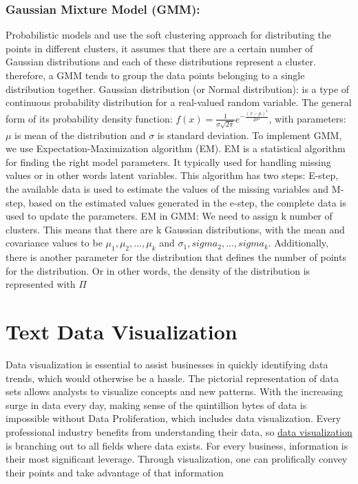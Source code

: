 \documentclass[a4paper,12pt]{report}
\begin{document}
    \subsubsection{Gaussian Mixture Model (GMM): }
    Probabilistic models and use the soft clustering approach for distributing the points in different clusters, it assumes that there are a certain number of Gaussian distributions and each of these distributions represent a cluster. therefore, a GMM tends to group the data points belonging to a single distribution together.
    \newline
    Gaussian distribution (or Normal distribution): is a type of continuous probability distribution for a real-valued random variable. The general form of its probability density function:
    $f(x) = \frac{1}{\sigma \sqrt{2\pi}}e^{-\frac{(x-\mu)^2}{2\sigma^2}}$, with parameters: $\mu$ is mean of the distribution and $\sigma$ is standard deviation.
    \newline
    To implement GMM, we use Expectation-Maximization algorithm (EM). EM is a statistical algorithm for finding the right model parameters.
    It typically used for handling missing values or in other words latent variables. This algorithm has two steps: E-step, the available data is used to estimate the values of the missing variables
    and M-step, based on the estimated values generated in the e-step, the complete data is used to update the parameters.
    \newline
    EM in GMM: We need to assign k number of clusters. This means that there are k Gaussian distributions, with the mean and covariance values to be $\mu_1, \mu_2, ..., \mu_k$
    and $\sigma_1, sigma_2, ..., sigma_k$. Additionally, there is another parameter for the distribution that defines the number of points for the distribution. Or in other words, the density of the distribution is represented with $\Pi$


    \section{Text Data Visualization}
    Data visualization is essential to assist businesses in quickly identifying data trends, which would otherwise be a hassle. The pictorial representation of data sets allows analysts to visualize concepts and new patterns. With the increasing surge in data every day, making sense of the quintillion bytes of data is impossible without Data Proliferation, which includes data visualization.
    \newline
    Every professional industry benefits from understanding their data, so \href{https://splashbi.com/visualizations/}{data visualization} is branching out to all fields where data exists. For every business, information is their most significant leverage. Through visualization, one can prolifically convey their points and take advantage of that information
    
\end{document}
